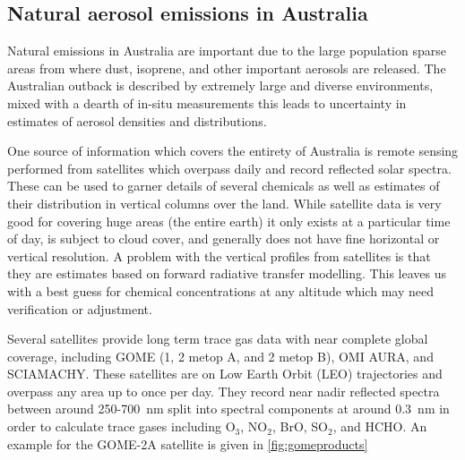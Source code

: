 \subsection{Natural aerosol emissions in Australia}
Natural emissions in Australia are important due to the large population sparse areas from where dust, isoprene, and other important aerosols are released.
The Australian outback is described by extremely large and diverse environments, mixed with a dearth of in-situ measurements this leads to uncertainty in estimates of aerosol densities and distributions.

One source of information which covers the entirety of Australia is remote sensing performed from satellites which overpass daily and record reflected solar spectra.
These can be used to garner details of several chemicals as well as estimates of their distribution in vertical columns over the land.
While satellite data is very good for covering huge areas (the entire earth) it only exists at a particular time of day, is subject to cloud cover, and generally does not have fine horizontal or vertical resolution.
A problem with the vertical profiles from satellites is that they are estimates based on forward radiative transfer modelling.
This leaves us with a best guess for chemical concentrations at any altitude which may need verification or adjustment.

Several satellites provide long term trace gas data with near complete global coverage, including GOME (1, 2 metop A, and 2 metop B), OMI AURA, and SCIAMACHY.
These satellites are on Low Earth Orbit (LEO) trajectories and overpass any area up to once per day. 
They record near nadir reflected spectra between around 250-700~nm split into spectral components at around $0.3$~nm in order to calculate trace gases including O$_3$, NO$_2$, BrO, SO$_2$, and HCHO.
An example for the GOME-2A satellite is given in \ref{fig:gomeproducts}




  
  
  